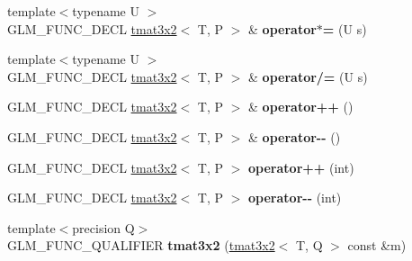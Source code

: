 \begin{DoxyCompactItemize}
\item 
\hypertarget{structglm_1_1detail_1_1tmat3x2_a93560e047aaaafb312d67167380087cb}{{\footnotesize template$<$typename U $>$ }\\G\-L\-M\-\_\-\-F\-U\-N\-C\-\_\-\-D\-E\-C\-L \hyperlink{structglm_1_1detail_1_1tmat3x2}{tmat3x2}$<$ T, P $>$ \& {\bfseries operator$\ast$=} (U s)}\label{structglm_1_1detail_1_1tmat3x2_a93560e047aaaafb312d67167380087cb}

\item 
\hypertarget{structglm_1_1detail_1_1tmat3x2_a6cee280523aedb0afd6792a2712c55b4}{{\footnotesize template$<$typename U $>$ }\\G\-L\-M\-\_\-\-F\-U\-N\-C\-\_\-\-D\-E\-C\-L \hyperlink{structglm_1_1detail_1_1tmat3x2}{tmat3x2}$<$ T, P $>$ \& {\bfseries operator/=} (U s)}\label{structglm_1_1detail_1_1tmat3x2_a6cee280523aedb0afd6792a2712c55b4}

\item 
\hypertarget{structglm_1_1detail_1_1tmat3x2_aa739464db6e7ce980fbc84276c6647c1}{G\-L\-M\-\_\-\-F\-U\-N\-C\-\_\-\-D\-E\-C\-L \hyperlink{structglm_1_1detail_1_1tmat3x2}{tmat3x2}$<$ T, P $>$ \& {\bfseries operator++} ()}\label{structglm_1_1detail_1_1tmat3x2_aa739464db6e7ce980fbc84276c6647c1}

\item 
\hypertarget{structglm_1_1detail_1_1tmat3x2_aee4f32e3b1bd8b4e9def345a530b3499}{G\-L\-M\-\_\-\-F\-U\-N\-C\-\_\-\-D\-E\-C\-L \hyperlink{structglm_1_1detail_1_1tmat3x2}{tmat3x2}$<$ T, P $>$ \& {\bfseries operator-\/-\/} ()}\label{structglm_1_1detail_1_1tmat3x2_aee4f32e3b1bd8b4e9def345a530b3499}

\item 
\hypertarget{structglm_1_1detail_1_1tmat3x2_a33e503443ab8dea023c343c0c5b9a91c}{G\-L\-M\-\_\-\-F\-U\-N\-C\-\_\-\-D\-E\-C\-L \hyperlink{structglm_1_1detail_1_1tmat3x2}{tmat3x2}$<$ T, P $>$ {\bfseries operator++} (int)}\label{structglm_1_1detail_1_1tmat3x2_a33e503443ab8dea023c343c0c5b9a91c}

\item 
\hypertarget{structglm_1_1detail_1_1tmat3x2_a3547cfdefa716317277db523703debee}{G\-L\-M\-\_\-\-F\-U\-N\-C\-\_\-\-D\-E\-C\-L \hyperlink{structglm_1_1detail_1_1tmat3x2}{tmat3x2}$<$ T, P $>$ {\bfseries operator-\/-\/} (int)}\label{structglm_1_1detail_1_1tmat3x2_a3547cfdefa716317277db523703debee}

\item 
\hypertarget{structglm_1_1detail_1_1tmat3x2_a5b0141e3e353259aed227c013a5ae5a0}{{\footnotesize template$<$precision Q$>$ }\\G\-L\-M\-\_\-\-F\-U\-N\-C\-\_\-\-Q\-U\-A\-L\-I\-F\-I\-E\-R {\bfseries tmat3x2} (\hyperlink{structglm_1_1detail_1_1tmat3x2}{tmat3x2}$<$ T, Q $>$ const \&m)}\label{structglm_1_1detail_1_1tmat3x2_a5b0141e3e353259aed227c013a5ae5a0}


\end{DoxyCompactItemize}
